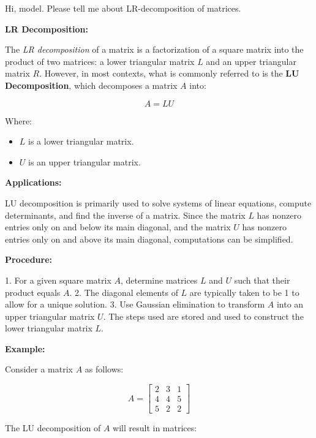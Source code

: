 \begin{ai}
Hi, model. Please tell me about LR-decomposition of matrices.
\end{ai}

\begin{airesult}
\textbf{LR Decomposition:}

The \textit{LR decomposition} of a matrix is a factorization of a square matrix into the product of
two matrices: a lower triangular matrix \(L\) and an upper triangular matrix \(R\). However, in most
contexts, what is commonly referred to is the \textbf{LU Decomposition}, which decomposes a matrix
\(A\) into:

\[
A = LU
\]

Where:
\begin{itemize}
  \item \(L\) is a lower triangular matrix.
  \item \(U\) is an upper triangular matrix.
\end{itemize}

\vsp

\textbf{Applications:}

LU decomposition is primarily used to solve systems of linear equations, compute determinants, and
find the inverse of a matrix. Since the matrix \(L\) has nonzero entries only on and below its main
diagonal, and the matrix \(U\) has nonzero entries only on and above its main diagonal, computations
can be simplified.

\vsp

\textbf{Procedure:}

1. For a given square matrix \(A\), determine matrices \(L\) and \(U\) such that their product
equals \(A\).
2. The diagonal elements of \(L\) are typically taken to be 1 to allow for a unique solution.
3. Use Gaussian elimination to transform \(A\) into an upper triangular matrix \(U\). The steps used
are stored and used to construct the lower triangular matrix \(L\).

\vsp

\textbf{Example:}

Consider a matrix \(A\) as follows:

\[
A = \begin{bmatrix}
2 & 3 & 1 \\
4 & 4 & 5 \\
5 & 2 & 2
\end{bmatrix}
\]

The LU decomposition of \(A\) will result in matrices:


\end{airesult}
